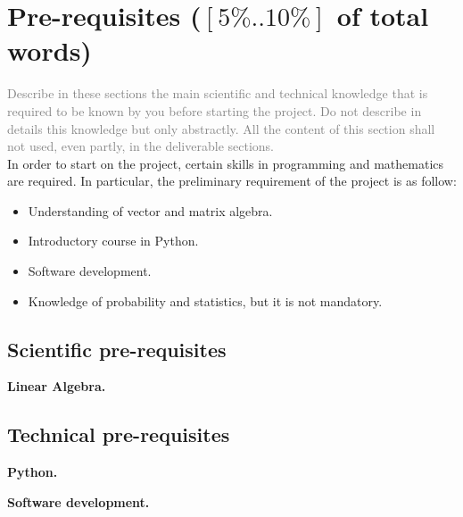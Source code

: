 \section{Pre-requisites ($[5\%..10\%]$ of total words)} 
\textcolor{gray}{Describe in these sections the main scientific and technical
  knowledge that is required to be known by you before starting the project.  Do
  not describe in details this knowledge but only abstractly. All the content of
  this section shall not used, even partly, in the deliverable sections.}\\

In order to start on the project, certain skills in programming
and mathematics are required. In particular, the preliminary requirement of
the project is as follow:
\begin{itemize}
        \item Understanding of vector and matrix algebra.
        \item Introductory course in Python.
        \item Software development.
        \item Knowledge of probability and statistics, but it is not
                mandatory.
\end{itemize}

\subsection{Scientific pre-requisites}

\textbf{Linear Algebra.} 

\subsection{Technical pre-requisites}

\textbf{Python.} 

\textbf{Software development.} 
